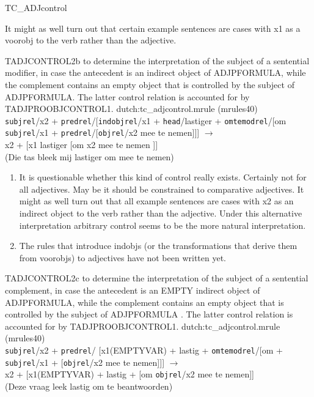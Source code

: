 \begin{mruleclass}{TC\_ADJcontrol}
\begin{members}
\begin{member}
\remarks\mbox{}
It might as well turn out that certain example sentences are
cases with  x1 as  a voorobj to the verb rather than the adjective.
\end{member}
\begin{member}
 TADJCONTROL2b
 to determine the interpretation of the subject of
a sentential modifier, in case the antecedent is an indirect object 
of ADJPFORMULA,
 while the complement contains an empty object that is 
controlled by the subject of ADJPFORMULA. 
The latter control relation is 
accounted for by TADJPROOBJCONTROL1. 
\file dutch:tc\_adjcontrol.mrule (mrules40)
\semantics \nosemantics
\example\mbox{}\\ 
{\tt subjrel}/x2 + {\tt predrel}/[{\tt indobjrel}/x1  + 
{\tt head}/lastiger + 
{\tt omtemodrel}/[om {\tt subjrel}/x1 + 
{\tt predrel}/[{\tt objrel}/x2 mee te nemen]]]
$\rightarrow$\\
 x2 + [x1 
lastiger [om x2 mee te nemen ]]\\
(Die tas bleek mij lastiger om mee te nemen) \\

\remarks\mbox{} 
\begin{enumerate}
\item
It is questionable whether this kind of control really exists.
Certainly not for all adjectives. May be it 
should be 
constrained to comparative adjectives.
It might as well turn out that all example sentences are
cases with  x2 as  an indirect object to the verb rather than the adjective.
Under this alternative interpretation 
arbitrary control seems to be the more natural interpretation.
  \item 
The rules that introduce indobjs (or the transformations that 
derive them from voorobjs) to adjectives have not been 
written yet.
 \end{enumerate}

\end{member}
\begin{member}
 TADJCONTROL2c
 to determine the interpretation of the subject of a sentential 
complement, in case the antecedent is an EMPTY indirect object 
of ADJPFORMULA, while the complement contains an empty object that is 
controlled by the subject of ADJPFORMULA .
The latter control relation is 
accounted for by TADJPROOBJCONTROL1.
\file dutch:tc\_adjcontrol.mrule (mrules40)
\semantics \nosemantics
\example\mbox{}\\
{\tt subjrel}/x2 + {\tt predrel}/
[x1(EMPTYVAR) + lastig +
{\tt omtemodrel}/[om + {\tt subjrel}/x1 + [{\tt objrel}/x2 mee te nemen]]]
$\rightarrow$\\
x2 + 
[x1(EMPTYVAR) + lastig  + [om {\tt objrel}/x2 mee te nemen]]\\
(Deze vraag leek  lastig om te beantwoorden)


\end{member}
\end{members}
\end{mruleclass}
